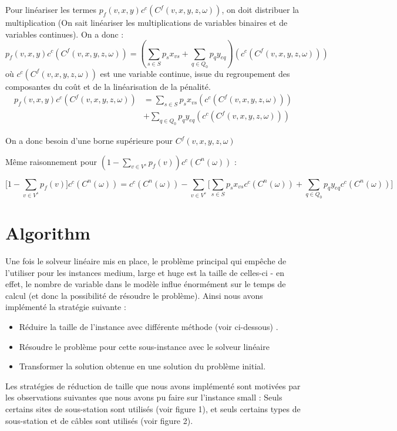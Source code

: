 \documentclass[a4paper,12pt]{article}
\begin{document}
\begin {enumerate}
{    Pour linéariser les termes $p_f(v, x, y) c^c(C^f(v, x, y, z ,\omega))$, on doit distribuer la multiplication
    (On sait linéariser les multiplications de variables binaires et de variables continues). On a donc :
    $$ p_f(v, x, y) c^c(C^f(v, x, y, z ,\omega)) = (\sum _ {s \in S} p_s x_{vs} + \sum _{q \in Q_0} p_q y _{eq}) (c^c(C^f(v, x, y, z ,\omega)))  $$
    où $c^c(C^f(v, x, y, z ,\omega))$ est une variable continue, issue du regroupement des composantes du coût et de la linéarisation de la pénalité.
    $$
    \begin{aligned}
        p_f(v, x, y) c^c(C^f(v, x, y, z ,\omega)) &= \sum _ {s \in S} p_s x_{vs} (c^c(C^f(v, x, y, z ,\omega))) \\
        &+ \sum _{q \in Q_0} p_q y _{eq} (c^c(C^f(v, x, y, z ,\omega)))
    \end{aligned}
    $$

    On a donc besoin d'une borne supérieure pour $C^f(v, x, y, z ,\omega)$

    Même raisonnement pour $(1 - \sum _{v \in V^s} p_f(v)) c^c(C^n(\omega))$ :

    $$ \lbrack 1 - \sum _{v \in V^s} p_f(v) \rbrack c^c(C^n(\omega)) = 
    c^c(C^n(\omega)) - \sum _{v \in V^s} \lbrack \sum _{s \in S} p_s x_{vs} c^c(C^n(\omega)) + \sum _{q \in Q_0} p_q y _{eq} c^c(C^n(\omega)) \rbrack  $$
}


\end{enumerate}

\section {Algorithm}
Une fois le solveur linéaire mis en place, le problème principal qui empêche de l'utiliser pour les instances medium, large et huge est la taille de celles-ci - en effet, le nombre de variable dans le modèle influe énormément sur le temps de calcul (et donc la possibilité de résoudre le problème). 
Ainsi nous avons implémenté la stratégie suivante :
\begin{itemize}
    \item Réduire la taille de l'instance avec différente méthode (voir ci-dessous) .
    \item Résoudre le problème pour cette sous-instance avec le solveur linéaire
    \item Transformer la solution obtenue en une solution du problème initial.
\end{itemize}
Les stratégies de réduction de taille que nous avons implémenté sont motivées par les observations suivantes que nous avons pu faire sur l'instance small :
Seuls certains sites de sous-station sont utilisés (voir figure 1), et seuls certains types de sous-station et de câbles sont utilisés (voir figure 2).
\end{document}
